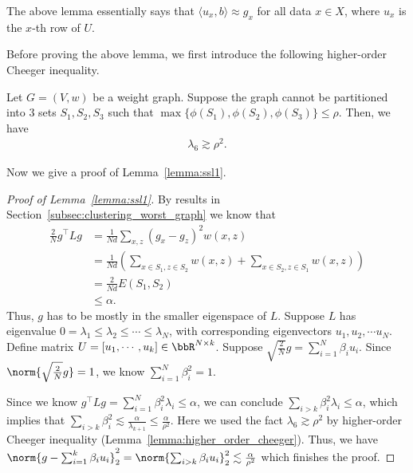 The above lemma essentially says that $\langle u_x, b \rangle\approx g_x$ for all data $x\in X$, where $u_x$ is the $x$-th row of $U$. 

Before proving the above lemma, we first introduce the following higher-order Cheeger inequality. 
\begin{lemma}\label{lemma:higher_order_cheeger}
	Let $G=(V, w)$ be a weight graph.  Suppose the graph cannot be partitioned into $3$ sets $S_1, S_2, S_3$ such that $\max\{\phi(S_1), \phi(S_2), \phi(S_3)\} \le \rho$. Then, we have
	\begin{align*}
		 \lambda_{6} \gtrsim\rho^2.
	\end{align*}
\end{lemma}

Now we give a proof of Lemma~\ref{lemma:ssl1}.
\begin{proof}[Proof of Lemma~\ref{lemma:ssl1}]
	By results in Section~\ref{subsec:clustering_worst_graph} we know that 
\begin{align}
	\frac{2}{N} g^\top L g &= \frac{1}{Nd} \sum_{x, z} (g_x - g_z)^2 w(x, z)\\
	&= \frac{1}{Nd} \left(\sum_{x\in S_1, z\in S_2} w(x, z) + \sum_{x\in S_2, z\in S_1} w(x, z)\right)\\
	&= \frac{2}{Nd} E(S_1, S_2) \\
	&\le \alpha.
\end{align}
Thus, $g$ has to be mostly in the smaller eigenspace of $L$.  Suppose $L$ has eigenvalue $0=\lambda_1\le\lambda_2 \le \cdots \le \lambda_N $, with corresponding eigenvectors $u_1, u_2, \cdots u_N$. Define matrix $U=[u_1, \cdots, u_k] \in \bbR^{N\times k}$. Suppose $\sqrt{\frac{2}{N}}g = \sum_{i=1}^N \beta_i u_i$. Since $\norm{\sqrt{\frac{2}{N}}g}=1$, we know $\sum_{i=1}^N \beta_i^2 = 1$.

Since we know $g^\top L g = \sum_{i=1}^N \beta_i^2 \lambda_i \le \alpha$, we can conclude $\sum_{i>k} \beta_i^2 \lambda_i \le \alpha$, which implies that $\sum_{i>k}\beta_i^2 \lesssim \frac{\alpha}{\lambda_{k+1}} \le \frac{\alpha}{\rho^2}$. Here we used the fact $\lambda_6 \gtrsim \rho^2$ by higher-order Cheeger inequality (Lemma~\ref{lemma:higher_order_cheeger}). Thus, we have $\norm{g-\sum_{i=1}^k \beta_i u_i}_2^2 = \norm{\sum_{i>k} \beta_i u_i}_2^2 \lesssim \frac{\alpha}{\rho^2}$ which finishes the proof. 

\end{proof}